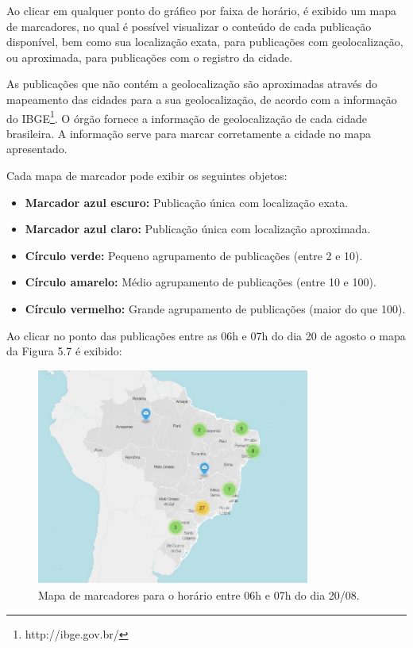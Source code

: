 Ao clicar em qualquer ponto do gráfico por faixa de horário, é exibido um mapa de marcadores, no qual é possível visualizar o conteúdo de cada publicação disponível, bem como sua localização exata, para publicações com geolocalização, ou aproximada, para publicações com o registro da cidade. 

As publicações que não contém a geolocalização são aproximadas através do mapeamento das cidades para a sua geolocalização, de acordo com a informação do IBGE\footnote{http://ibge.gov.br/}. O órgão fornece a informação de geolocalização de cada cidade brasileira. A informação serve para marcar corretamente a cidade no mapa apresentado.

Cada mapa de marcador pode exibir os seguintes objetos:

\begin{itemize}
  \item \textbf{Marcador azul escuro:} Publicação única com localização exata.
  \item \textbf{Marcador azul claro:} Publicação única com localização aproximada.
  \item \textbf{Círculo verde:} Pequeno agrupamento de publicações (entre 2 e 10).
  \item \textbf{Círculo amarelo:} Médio agrupamento de publicações (entre 10 e 100).
  \item \textbf{Círculo vermelho:} Grande agrupamento de publicações (maior do que 100).
\end{itemize}

Ao clicar no ponto das publicações entre as 06h e 07h do dia 20 de agosto o mapa da Figura 5.7 é exibido:

\begin{figure}[h!]
  \begin{center}
  \includegraphics[width=0.8\textwidth]{figuras/mapa-marcador.pdf}
  \caption{Mapa de marcadores para o horário entre 06h e 07h do dia 20/08.}
  \end{center}
\end{figure}

